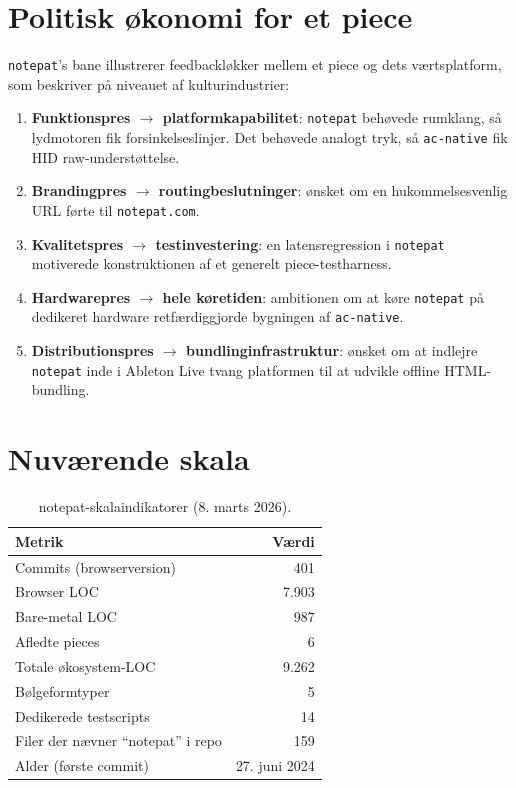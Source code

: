 \documentclass[10pt,letterpaper,twocolumn]{article}
\begin{document}
\section{Politisk økonomi for et piece}

\texttt{notepat}'s bane illustrerer feedbackløkker mellem et piece og dets værtsplatform, som \citet{nieborg2018platformization} beskriver på niveauet af kulturindustrier:

\begin{enumerate}
  \item \textbf{Funktionspres $\rightarrow$ platformkapabilitet}: \texttt{notepat} behøvede rumklang, så lydmotoren fik forsinkelseslinjer. Det behøvede analogt tryk, så \texttt{ac-native} fik HID raw-understøttelse.
  \item \textbf{Brandingpres $\rightarrow$ routingbeslutninger}: ønsket om en hukommelsesvenlig URL førte til \texttt{notepat.com}.
  \item \textbf{Kvalitetspres $\rightarrow$ testinvestering}: en latensregression i \texttt{notepat} motiverede konstruktionen af et generelt piece-testharness.
  \item \textbf{Hardwarepres $\rightarrow$ hele køretiden}: ambitionen om at køre \texttt{notepat} på dedikeret hardware retfærdiggjorde bygningen af \texttt{ac-native}.
  \item \textbf{Distributionspres $\rightarrow$ bundlinginfrastruktur}: ønsket om at indlejre \texttt{notepat} inde i Ableton Live tvang platformen til at udvikle offline HTML-bundling.
\end{enumerate}

\section{Nuværende skala}

\begin{table}[h]
\small\centering
\begin{tabularx}{\columnwidth}{l r}
\toprule
\textbf{Metrik} & \textbf{Værdi} \\
\midrule
Commits (browserversion) & 401 \\
Browser LOC & 7.903 \\
Bare-metal LOC & 987 \\
Afledte pieces & 6 \\
Totale økosystem-LOC & 9.262 \\
Bølgeformtyper & 5 \\
Dedikerede testscripts & 14 \\
Filer der nævner ``notepat'' i repo & 159 \\
Alder (første commit) & 27. juni 2024 \\
\bottomrule
\end{tabularx}
\caption{notepat-skalaindikatorer (8. marts 2026).}
\label{tab:scale}
\end{table}
\end{document}
